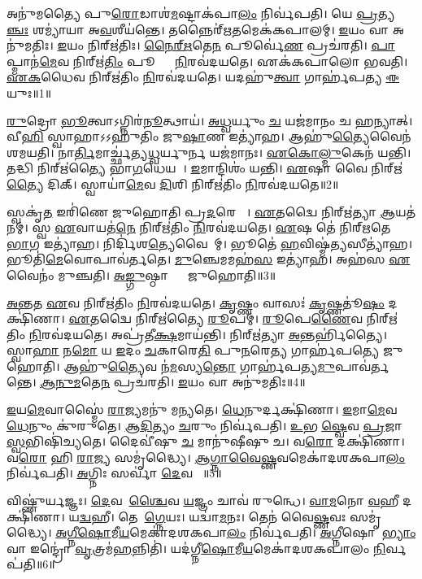𑌅𑌨𑍁॑𑌮𑌤𑍍𑌯𑍈 𑌪𑍁\ul{𑌰𑍋}𑌡𑌾𑌶॑\ul{𑌮}𑌷𑍍𑌟𑌾𑌕॑𑌪𑌾\ul{𑌲𑌂} 𑌨𑌿𑌰𑍍𑌵॑𑌪𑌤𑌿।
𑌯𑍇 \ul{𑌪𑍍𑌰}𑌤𑍍𑌯\ul{𑌞𑍍𑌚𑌃} 𑌶𑌮𑍍𑌯𑌾॑𑌯𑌾 𑌅\ul{𑌵}𑌶𑍀𑌯॑𑌨𑍍𑌤𑍇।
𑌤𑌨𑍍𑌨𑍈𑌰𑍍॑\ul{𑌋}𑌤𑌮𑍇𑌕॑𑌕𑌪𑌾𑌲𑌮𑍍।
\ul{𑌇}𑌯𑌂 𑌵𑌾 𑌅𑌨𑍁॑𑌮𑌤𑌿𑌃।
\ul{𑌇}𑌯𑌂 𑌨𑌿𑌰𑍍\mbox{}𑌋॑𑌤𑌿𑌃।
\ul{𑌨𑍈}\ul{𑌰𑍍}\ul{𑌋}𑌤𑍇\ul{𑌨} 𑌪𑍂𑌰𑍍𑌵𑍇॑\ul{𑌣} 𑌪𑍍𑌰𑌚॑𑌰𑌤𑌿।
\ul{𑌪𑌾}𑌪𑍍𑌮𑌾𑌨॑\ul{𑌮𑍇}𑌵 𑌨𑌿𑌰𑍍\mbox{}𑌋॑\ul{𑌤𑌿𑌂} 𑌪𑍂𑌰𑍍𑌵𑌾𑌂᳚ \ul{𑌨𑌿}𑌰𑌵॑𑌦𑌯𑌤𑍇।
𑌏𑌕॑𑌕𑌪𑌾𑌲𑍋 𑌭𑌵𑌤𑌿।
\ul{𑌏}\ul{𑌕}𑌧𑍈𑌵 𑌨𑌿𑌰𑍍\mbox{}𑌋॑𑌤𑌿𑌂 \ul{𑌨𑌿}𑌰𑌵॑𑌦𑌯𑌤𑍇।
𑌯𑌦𑌹𑍁॑\ul{𑌤𑍍𑌵𑌾} 𑌗𑌾𑌰𑍍\mbox{}𑌹॑𑌪𑌤𑍍𑌯 \ul{𑌈}𑌯𑍁𑌃॥1॥

\ul{𑌰𑍁}𑌦𑍍𑌰𑍋 \ul{𑌭𑍂}𑌤𑍍𑌵𑌾\-𑌽𑌗𑍍𑌨𑌿𑌰॑\ul{𑌨𑍂}𑌤𑍍𑌥𑌾𑌯॑।
\ul{𑌅}\ul{𑌧𑍍𑌵}𑌰𑍍𑌯𑍁𑌂 \ul{𑌚} 𑌯𑌜॑𑌮𑌾𑌨𑌂 𑌚 𑌹𑌨𑍍𑌯𑌾𑌤𑍍।
𑌵𑍀\ul{𑌹𑌿} 𑌸𑍍𑌵𑌾𑌹𑌾\-𑌽𑌽𑌹𑍁॑𑌤𑌿𑌂 𑌜𑍁\ul{𑌷𑌾}𑌣 𑌇𑌤𑍍𑌯𑌾॑𑌹।
𑌆𑌹𑍁॑\ul{𑌤𑍍𑌯𑍈}𑌵𑍈𑌨॑ 𑌶𑌮𑌯𑌤𑌿।
𑌨𑌾\ul{𑌰𑍍𑌤𑌿}𑌮𑌾𑌰𑍍𑌚𑍍𑌛॑𑌤𑍍𑌯\ul{𑌧𑍍𑌵}𑌰𑍍𑌯𑍁𑌰𑍍𑌨 𑌯𑌜॑𑌮𑌾𑌨𑌃।
\ul{𑌏}\ul{𑌕𑍋}\ul{𑌲𑍍𑌮𑍁}𑌕𑍇𑌨॑ 𑌯𑌨𑍍𑌤𑌿।
𑌤𑌦𑍍𑌧𑌿 𑌨𑌿𑌰𑍍\mbox{}𑌋॑𑌤𑍍𑌯𑍈 𑌭𑌾\ul{𑌗}𑌧𑍇𑌯𑌮𑍍᳚।
\ul{𑌇}𑌮𑌾𑌨𑍍𑌦𑌿𑌶𑌂॑ 𑌯𑌨𑍍𑌤𑌿।
\ul{𑌏}𑌷𑌾 𑌵𑍈 𑌨𑌿𑌰𑍍\mbox{}𑌋॑\ul{𑌤𑍍𑌯𑍈} 𑌦𑌿𑌕𑍍।
𑌸𑍍𑌵𑌾𑌯𑌾॑\ul{𑌮𑍇}𑌵 \ul{𑌦𑌿}𑌶𑌿 𑌨𑌿𑌰𑍍\mbox{}𑌋॑𑌤𑌿𑌂 \ul{𑌨𑌿}𑌰𑌵॑𑌦𑌯𑌤𑍇॥2॥

𑌸𑍍𑌵𑌕𑍃॑\ul{𑌤} 𑌇𑌰𑌿॑𑌣𑍇 𑌜𑍁𑌹𑍋𑌤𑌿 𑌪𑍍𑌰\ul{𑌦}𑌰𑍇 𑌵𑌾᳚।
\ul{𑌏}𑌤𑌦𑍍𑌵𑍈 𑌨𑌿𑌰𑍍\mbox{}𑌋॑𑌤𑍍𑌯𑌾 \ul{𑌆}𑌯𑌤॑𑌨𑌮𑍍।
𑌸𑍍𑌵 \ul{𑌏}𑌵𑌾𑌯𑌤॑\ul{𑌨𑍇} 𑌨𑌿𑌰𑍍\mbox{}𑌋॑𑌤𑌿𑌂 \ul{𑌨𑌿}𑌰𑌵॑𑌦𑌯𑌤𑍇।
\ul{𑌏}𑌷 𑌤𑍇॑ 𑌨𑌿𑌰𑍍‌\mbox{}𑌋𑌤𑍇 \ul{𑌭𑌾}𑌗 𑌇𑌤𑍍𑌯𑌾॑𑌹।
𑌨𑌿𑌰𑍍𑌦𑌿॑𑌶\ul{𑌤𑍍𑌯𑍇}𑌵𑍈𑌨𑌾᳚𑌮𑍍।
𑌭𑍂𑌤𑍇॑ \ul{𑌹}𑌵𑌿𑌷𑍍𑌮॑\ul{𑌤𑍍𑌯}𑌸𑍀𑌤𑍍𑌯𑌾॑𑌹।
𑌭𑍂𑌤𑌿॑\ul{𑌮𑍇}𑌵𑍋𑌪𑌾𑌵॑𑌰𑍍𑌤𑌤𑍇।
\ul{𑌮𑍁}𑌞𑍍𑌚𑍇𑌮𑌮𑌹॑\ul{𑌸} 𑌇𑌤𑍍𑌯𑌾॑𑌹।
𑌅𑌹॑𑌸 \ul{𑌏}𑌵𑍈𑌨𑌂॑ 𑌮𑍁𑌞𑍍𑌚𑌤𑌿।
\ul{𑌅}\ul{𑌙𑍍𑌗𑍁}𑌷𑍍𑌠𑌾𑌭𑍍𑌯𑌾𑌂᳚ 𑌜𑍁𑌹𑍋𑌤𑌿॥3॥

\ul{𑌅}\ul{𑌨𑍍𑌤}𑌤 \ul{𑌏}𑌵 𑌨𑌿𑌰𑍍\mbox{}𑌋॑𑌤𑌿𑌂 \ul{𑌨𑌿}𑌰𑌵॑𑌦𑌯𑌤𑍇।
\ul{𑌕𑍃}𑌷𑍍𑌣𑌂 𑌵𑌾𑌸𑌃॑ \ul{𑌕𑍃}𑌷𑍍𑌣𑌤𑍂॑\ul{𑌷𑌂} 𑌦𑌕𑍍𑌷𑌿॑𑌣𑌾।
\ul{𑌏}𑌤𑌦𑍍𑌵𑍈 𑌨𑌿𑌰𑍍\mbox{}𑌋॑𑌤𑍍𑌯𑍈 \ul{𑌰𑍂}𑌪𑌮𑍍।
\ul{𑌰𑍂}𑌪𑍇\ul{𑌣𑍈}𑌵 𑌨𑌿𑌰𑍍\mbox{}𑌋॑𑌤𑌿𑌂 \ul{𑌨𑌿}𑌰𑌵॑𑌦𑌯𑌤𑍇।
𑌅𑌪𑍍𑌰॑𑌤𑍀\ul{𑌕𑍍𑌷}𑌮𑌾𑌯॑𑌨𑍍𑌤𑌿।
𑌨𑌿𑌰𑍍\mbox{}𑌋॑𑌤𑍍𑌯𑌾 \ul{𑌅}𑌨𑍍𑌤𑌰𑍍\mbox{}𑌹𑌿॑𑌤𑍍𑌯𑍈।
𑌸𑍍𑌵𑌾\ul{𑌹𑌾} 𑌨\ul{𑌮𑍋} 𑌯 \ul{𑌇}𑌦𑌂 \ul{𑌚}𑌕𑌾𑌰𑍇\ul{𑌤𑌿} 𑌪𑍁\ul{𑌨}𑌰𑍇\ul{𑌤𑍍𑌯} 𑌗𑌾𑌰𑍍\mbox{}𑌹॑𑌪𑌤𑍍𑌯𑍇 𑌜𑍁𑌹𑍋𑌤𑌿।
𑌆𑌹𑍁॑\ul{𑌤𑍍𑌯𑍈}𑌵 𑌨॑\ul{𑌮}𑌸𑍍𑌯\ul{𑌨𑍍𑌤𑍋} 𑌗𑌾𑌰𑍍\mbox{}𑌹॑𑌪𑌤𑍍𑌯\ul{𑌮𑍁}𑌪𑌾𑌵॑𑌰𑍍𑌤𑌨𑍍𑌤𑍇।
\ul{𑌆}\ul{𑌨𑍁}\ul{𑌮}𑌤𑍇\ul{𑌨} 𑌪𑍍𑌰𑌚॑𑌰𑌤𑌿।
\ul{𑌇}𑌯𑌂 𑌵𑌾 𑌅𑌨𑍁॑𑌮𑌤𑌿𑌃॥4॥

\ul{𑌇}𑌯\ul{𑌮𑍇}𑌵𑌾𑌸𑍍𑌮𑍈॑ \ul{𑌰𑌾}𑌜𑍍𑌯𑌮𑌨𑍁॑ 𑌮𑌨𑍍𑌯𑌤𑍇।
\ul{𑌧𑍇}𑌨𑍁𑌰𑍍𑌦𑌕𑍍𑌷𑌿॑𑌣𑌾।
\ul{𑌇}𑌮𑌾\ul{𑌮𑍇}𑌵 \ul{𑌧𑍇}𑌨𑍁𑌂 𑌕𑍁॑𑌰𑍁𑌤𑍇।
\ul{𑌆}\ul{𑌦𑌿}𑌤𑍍𑌯𑌂 \ul{𑌚}𑌰𑍁𑌂 𑌨𑌿𑌰𑍍𑌵॑𑌪𑌤𑌿।
\ul{𑌉}𑌭𑌯𑍀᳚\ul{𑌷𑍍𑌵𑍇}𑌵 \ul{𑌪𑍍𑌰}𑌜𑌾\ul{𑌸𑍍𑌵}𑌭𑌿𑌷𑌿॑𑌚𑍍𑌯𑌤𑍇।
𑌦𑍈𑌵𑍀॑𑌷𑍁 \ul{𑌚} 𑌮𑌾𑌨𑍁॑𑌷𑍀𑌷𑍁 𑌚।
𑌵\ul{𑌰𑍋} 𑌦𑌕𑍍𑌷𑌿॑𑌣𑌾।
𑌵\ul{𑌰𑍋} 𑌹𑌿 \ul{𑌰𑌾}𑌜𑍍𑌯 𑌸𑌮𑍃॑𑌦𑍍𑌧𑍍𑌯𑍈।
\ul{𑌆}\ul{𑌗𑍍𑌨𑌾}\ul{𑌵𑍈}\ul{𑌷𑍍𑌣}𑌵𑌮𑍇𑌕𑌾॑𑌦𑌶𑌕𑌪𑌾\ul{𑌲𑌂} 𑌨𑌿𑌰𑍍𑌵॑𑌪𑌤𑌿।
\ul{𑌅}𑌗𑍍𑌨𑌿𑌃 𑌸𑌰𑍍𑌵𑌾॑ \ul{𑌦𑍇}𑌵𑌤𑌾𑌃᳚॥5॥

𑌵𑌿𑌷𑍍𑌣𑍁॑𑌰𑍍\mbox{}\ul{𑌯}𑌜𑍍𑌞𑌃।
\ul{𑌦𑍇}𑌵𑌤𑌾᳚\ul{𑌶𑍍𑌚𑍈}𑌵 \ul{𑌯}𑌜𑍍𑌞𑌂 𑌚𑌾𑌵॑ 𑌰𑍁𑌨𑍍𑌧𑍇।
\ul{𑌵𑌾}\ul{𑌮}𑌨𑍋 \ul{𑌵}𑌹𑍀 𑌦𑌕𑍍𑌷𑌿॑𑌣𑌾।
𑌯\ul{𑌦𑍍𑌵}𑌹𑍀।
𑌤𑍇𑌨𑌾᳚\ul{𑌗𑍍𑌨𑍇}𑌯𑌃।
𑌯𑌦𑍍𑌵𑌾॑\ul{𑌮}𑌨𑌃।
𑌤𑍇𑌨॑ 𑌵𑍈\ul{𑌷𑍍𑌣}𑌵𑌃 𑌸𑌮𑍃॑𑌦𑍍𑌧𑍍𑌯𑍈।
\ul{𑌅}\ul{𑌗𑍍𑌨𑍀}\ul{𑌷𑍋}𑌮𑍀\ul{𑌯}𑌮𑍇𑌕𑌾॑𑌦𑌶𑌕𑌪𑌾\ul{𑌲𑌂} 𑌨𑌿𑌰𑍍𑌵॑𑌪𑌤𑌿।
\ul{𑌅}𑌗𑍍𑌨𑍀𑌷𑍋𑌮𑌾᳚\ul{𑌭𑍍𑌯𑌾𑌂} 𑌵𑌾 𑌇𑌨𑍍𑌦𑍍𑌰𑍋॑ \ul{𑌵𑍃}𑌤𑍍𑌰𑌮॑\ul{𑌹}𑌨𑍍𑌨𑌿𑌤𑌿॑।
𑌯𑌦॑𑌗𑍍𑌨𑍀\ul{𑌷𑍋}𑌮𑍀\ul{𑌯}𑌮𑍇𑌕𑌾॑𑌦𑌶𑌕𑌪𑌾𑌲𑌂 \ul{𑌨𑌿}𑌰𑍍𑌵𑌪॑𑌤𑌿॥6॥

